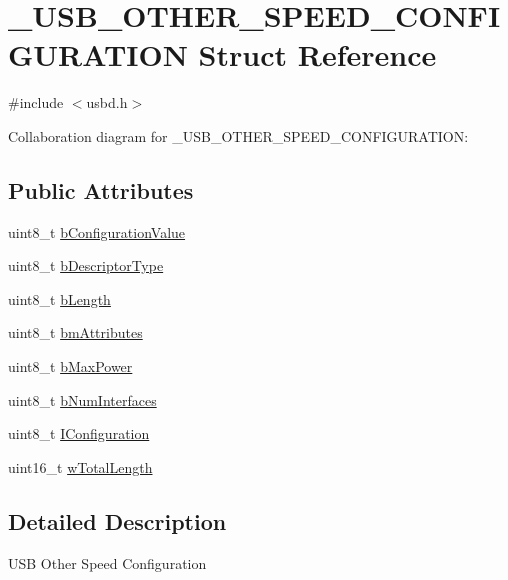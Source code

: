 \hypertarget{struct__USB__OTHER__SPEED__CONFIGURATION}{}\section{\+\_\+\+U\+S\+B\+\_\+\+O\+T\+H\+E\+R\+\_\+\+S\+P\+E\+E\+D\+\_\+\+C\+O\+N\+F\+I\+G\+U\+R\+A\+T\+I\+ON Struct Reference}
\label{struct__USB__OTHER__SPEED__CONFIGURATION}


{\ttfamily \#include $<$usbd.\+h$>$}



Collaboration diagram for \+\_\+\+U\+S\+B\+\_\+\+O\+T\+H\+E\+R\+\_\+\+S\+P\+E\+E\+D\+\_\+\+C\+O\+N\+F\+I\+G\+U\+R\+A\+T\+I\+ON\+:
\subsection*{Public Attributes}
\begin{DoxyCompactItemize}
\item 
uint8\+\_\+t \hyperlink{struct__USB__OTHER__SPEED__CONFIGURATION_a7e753546b3365270dd7904762c1cd104}{b\+Configuration\+Value}
\item 
uint8\+\_\+t \hyperlink{struct__USB__OTHER__SPEED__CONFIGURATION_ab8d0e53addf9904fbcad68ae45399805}{b\+Descriptor\+Type}
\item 
uint8\+\_\+t \hyperlink{struct__USB__OTHER__SPEED__CONFIGURATION_a8c70170e1f5bfcc1d77a8357a254050c}{b\+Length}
\item 
uint8\+\_\+t \hyperlink{struct__USB__OTHER__SPEED__CONFIGURATION_a5891367fc0fe6631ae99f1751651f81b}{bm\+Attributes}
\item 
uint8\+\_\+t \hyperlink{struct__USB__OTHER__SPEED__CONFIGURATION_a3764f1ba43fd9b053b8e4675e306ff5b}{b\+Max\+Power}
\item 
uint8\+\_\+t \hyperlink{struct__USB__OTHER__SPEED__CONFIGURATION_a7ebb3afc825c1940c5ff1c5b2907ac38}{b\+Num\+Interfaces}
\item 
uint8\+\_\+t \hyperlink{struct__USB__OTHER__SPEED__CONFIGURATION_a69e71d4b33b56469a4388c07e811e390}{I\+Configuration}
\item 
uint16\+\_\+t \hyperlink{struct__USB__OTHER__SPEED__CONFIGURATION_af624dbc10570cb8fbca7323c6bffcb70}{w\+Total\+Length}
\end{DoxyCompactItemize}


\subsection{Detailed Description}
U\+SB Other Speed Configuration 

